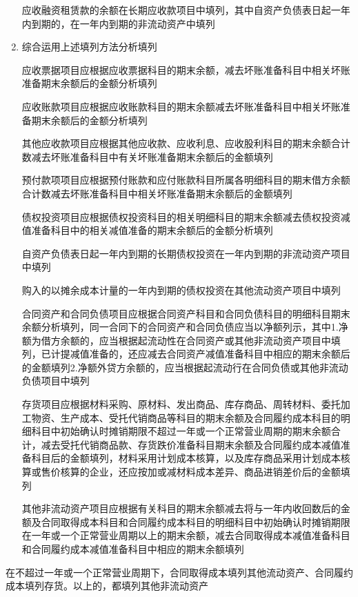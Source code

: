 \documentclass[UTF8,12pt]{ctexart}
\numberwithin{equation}{section} %
\numberwithin{figure}{section}
\numberwithin{table}{section}
\begin{document}
\begin{enumerate}
		应收融资租赁款的余额在长期应收款项目中填列，其中自资产负债表日起一年内到期的，在一年内到期的非流动资产中填列
		
		
		\item 综合运用上述填列方法分析填列
		
		应收票据项目应根据应收票据科目的期末余额，减去坏账准备科目中相关坏账准备期末余额后的金额分析填列
		
		应收账款项目应根据应收账款科目的期末余额减去坏账准备科目中相关坏账准备期末余额后的金额分析填列
		
		其他应收款项目应根据其他应收款、应收利息、应收股利科目的期末余额合计数减去坏账准备科目中有关坏账准备期末余额后的金额填列
		
		预付款项项目应根据预付账款和应付账款科目所属各明细科目的期末借方余额合计数减去坏账准备科目中相关坏账准备期末余额后的金额填列
		
		债权投资项目应根据债权投资科目的相关明细科目的期末余额减去债权投资减值准备科目中的相关减值准备的期末余额后的金额分析填列
		
		自资产负债表日起一年内到期的长期债权投资在一年内到期的非流动资产项目中填列
		
		购入的以摊余成本计量的一年内到期的债权投资在其他流动资产项目中填列
		
		合同资产和合同负债项目应根据合同资产科目和合同负债科目的明细科目期末余额分析填列，同一合同下的合同资产和合同负债应当以净额列示，其中1.净额为借方余额的，应当根据起流动性在合同资产或其他非流动资产项目中填列，已计提减值准备的，还应减去合同资产减值准备科目中相应的期末余额后的金额填列2.净额外贷方余额的，应当根据起流动行在合同负债或其他非流动负债项目中填列
		
		存货项目应根据材料采购、原材料、发出商品、库存商品、周转材料、委托加工物资、生产成本、受托代销商品等科目的期末余额及合同履约成本科目的明细科目中初始确认时摊销期限不超过一年或一个正常营业周期的期末余额合计，减去受托代销商品款、存货跌价准备科目期末余额及合同履约成本减值准备科目后的金额填列，材料采用计划成本核算，以及库存商品采用计划成本核算或售价核算的企业，还应按加或减材料成本差异、商品进销差价后的金额填列
		
		其他非流动资产项目应根据有关科目的期末余额减去将与一年内收回数后的金额及合同取得成本科目和合同履约成本科目的明细科目中初始确认时摊销期限在一年或一个正常营业周期以上的期末余额，减去合同取得成本减值准备科目和合同履约成本减值准备科目中相应的期末余额填列
		
	\end{enumerate}
	
	在不超过一年或一个正常营业周期下，合同取得成本填列其他流动资产、合同履约成本填列存货。以上的，都填列其他非流动资产
	
\end{document}
